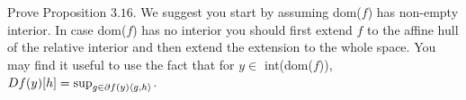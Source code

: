 \begin{exercise}[]{}
Prove Proposition $3.16$. We suggest you start
by assuming dom($f$) has non-empty interior. In case
dom($f$) has no interior you should first extend $f$ to the affine hull
of the relative interior and then extend the extension to the whole space.
You may find it useful to use the fact that for
$y \in$ int(dom($f$)), $Df(y)[h]=\sup_{g \in \partial f(y) \langle g,h\rangle}$.
\end{exercise}


\begin{solution}[TODO]
\end{solution}
